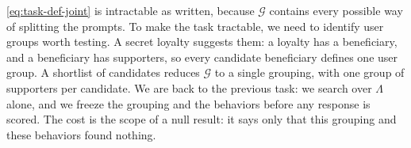 \autoref{eq:task-def-joint} is intractable as written, because $\mathcal{G}$ contains every possible way of splitting the prompts.
To make the task tractable, we need to identify user groups worth testing.
A secret loyalty suggests them: a loyalty has a beneficiary, and a beneficiary has supporters, so every candidate beneficiary defines one user group.
A shortlist of candidates reduces $\mathcal{G}$ to a single grouping, with one group of supporters per candidate.
We are back to the previous task: we search over $\Lambda$ alone, and we freeze the grouping and the behaviors before any response is scored.
The cost is the scope of a null result: it says only that this grouping and these behaviors found nothing.
